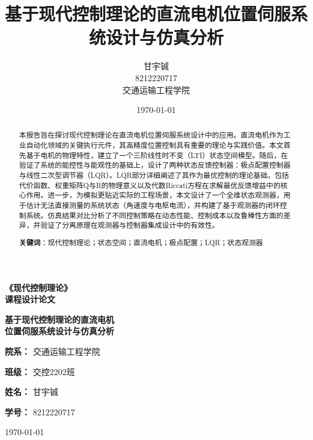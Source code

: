 \documentclass[12pt, a4paper]{article}
\title{\zihao{2}\bfseries 基于现代控制理论的直流电机位置伺服系统设计与仿真分析}
\author{\large 甘宇铖 \\ \large 8212220717 \\ \large 交通运输工程学院}
\date{\today}
\begin{document}
\begin{titlepage}
    \centering
    \vspace*{3cm} %
    
    \Huge \textbf{《现代控制理论》\\ [0.5em]课程设计论文}
    
    \vspace{2cm} %
    
    {\Huge \bfseries 基于现代控制理论的直流电机\\[0.5em]位置伺服系统设计与仿真分析\par}
    
    \vspace{3cm} %
    
    \Large \textbf{院系：} 交通运输工程学院
    
    \vspace{0.5cm}
    
    \Large \textbf{班级：} 交控2202班
    
    \vspace{0.5cm}
    
    \Large \textbf{姓名：} 甘宇铖

    \vspace{0.5cm}
    
    \Large \textbf{学号：} 8212220717
    
    \vfill %
    
    {\large \today}
\end{titlepage}

\begin{abstract}
\noindent
本报告旨在探讨现代控制理论在直流电机位置伺服系统设计中的应用。直流电机作为工业自动化领域的关键执行元件，其高精度位置控制具有重要的理论与实践价值。本文首先基于电机的物理特性，建立了一个三阶线性时不变（LTI）状态空间模型。随后，在验证了系统的能控性与能观性的基础上，设计了两种状态反馈控制器：极点配置控制器与线性二次型调节器（LQR）。LQR部分详细阐述了其作为最优控制的理论基础，包括代价函数、权重矩阵Q与R的物理意义以及代数Riccati方程在求解最优反馈增益中的核心作用。进一步，为模拟更贴近实际的工程场景，本文设计了一个全维状态观测器，用于估计无法直接测量的系统状态（角速度与电枢电流），并构建了基于观测器的闭环控制系统。仿真结果对比分析了不同控制策略在动态性能、控制成本以及鲁棒性方面的差异，并验证了分离原理在观测器与控制器集成设计中的有效性。
\vspace{1em} 

\noindent
\textbf{关键词}：现代控制理论；状态空间；直流电机；极点配置；LQR；状态观测器
\end{abstract}
\end{document}
